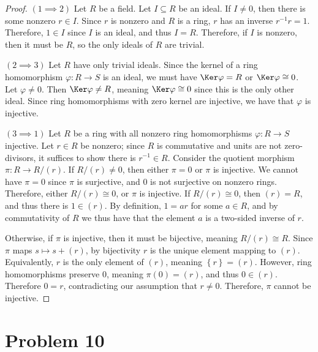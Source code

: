 \documentclass[11pt, letterpaper]{article}
\theoremstyle{plain}
\begin{document}
\begin{proof}
	$(1 \implies 2)$ Let $R$ be a field. Let $I\subseteq R$ be an ideal. If $I\neq 0$, then there is some nonzero $r\in I$. Since $r$ is nonzero and $R$ is a ring, $r$ has an inverse $r^{-1} r=1$. Therefore, $1\in I$ since $I$ is an ideal, and thus $I=R$. Therefore, if $I$ is nonzero, then it must be $R$, so the only ideals of $R$ are trivial.

	$(2 \implies 3)$ Let $R$ have only trivial ideals. Since the kernel of a ring homomorphism $\varphi  : R \to S$ is an ideal, we must have $\Ker \varphi =R$ or $\Ker \varphi \cong 0$. Let $\varphi \neq 0$. Then $\Ker \varphi \neq R$, meaning $\Ker \varphi \cong 0$ since this is the only other ideal. Since ring homomorphisms with zero kernel are injective, we have that $\varphi $ is injective.

	$(3 \implies 1)$ Let $R$ be a ring with all nonzero ring homomorphisms $\varphi : R \to S$ injective. Let $r\in R$ be nonzero; since $R$ is commutative and units are not zero-divisors, it suffices to show there is $r^{-1} \in R$. Consider the quotient morphism $\pi : R \to R/(r)$. If $R/(r)\neq 0$, then either $\pi =0$ or $\pi $ is injective. We cannot have $\pi =0$ since $\pi $ is surjective, and $0$ is not surjective on nonzero rings. Therefore, either $R/(r)\cong 0$, or $\pi $ is injective. If $R/(r)\cong 0$, then $(r)=R$, and thus there is $1\in (r)$. By definition, $1=ar$ for some $a\in R$, and by commutativity of $R$ we thus have that the element $a$ is a two-sided inverse of $r$.

Otherwise, if $\pi $ is injective, then it must be bijective, meaning $R/(r) \cong R$. Since $\pi $ maps $s\mapsto s+(r)$, by bijectivity $r$ is the unique element mapping to $(r)$. Equivalently, $r$ is the only element of $(r)$, meaning $\left\{ r \right\} =(r)$. However, ring homomorphisms preserve 0, meaning $\pi (0)=(r)$, and thus $0\in (r)$. Therefore $0=r$, contradicting our assumption that $r\neq 0$. Therefore, $\pi $ cannot be injective.
\end{proof}

\section{Problem 10}
\end{document}

